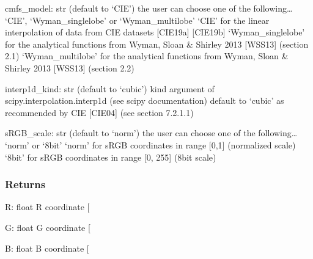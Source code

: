 \documentclass[letterpaper,10pt,english]{sphinxmanual}
\begin{document}
\begin{fulllineitems}
\sphinxAtStartPar
cmfs\_model: str (default to ‘CIE’)
the user can choose one of the following… ‘CIE’, ‘Wyman\_singlelobe’ or ‘Wyman\_multilobe’
‘CIE’ for the linear interpolation of data from CIE datasets {[}CIE19a{]} {[}CIE19b{]}
‘Wyman\_singlelobe’ for the analytical functions from Wyman, Sloan \& Shirley 2013 {[}WSS13{]} (section 2.1)
‘Wyman\_multilobe’ for the analytical functions from Wyman, Sloan \& Shirley 2013 {[}WSS13{]} (section 2.2)

\sphinxAtStartPar
interp1d\_kind: str (default to ‘cubic’)
kind argument of scipy.interpolation.interp1d (see scipy documentation)
default to ‘cubic’ as recommended by CIE {[}CIE04{]} (see section 7.2.1.1)

\sphinxAtStartPar
sRGB\_scale: str (default to ‘norm’)
the user can choose one of the following… ‘norm’ or ‘8bit’
‘norm’ for sRGB coordinates in range {[}0,1{]} (normalized scale)
‘8bit’ for sRGB coordinates in range {[}0, 255{]} (8\sphinxhyphen{}bit scale)


\subsubsection{Returns}
\label{\detokenize{07_colors:id29}}
\sphinxAtStartPar
R: float
R coordinate {[}\sphinxhyphen{}{]}

\sphinxAtStartPar
G: float
G coordinate {[}\sphinxhyphen{}{]}

\sphinxAtStartPar
B: float
B coordinate {[}\sphinxhyphen{}{]}

\end{fulllineitems}

\end{document}
